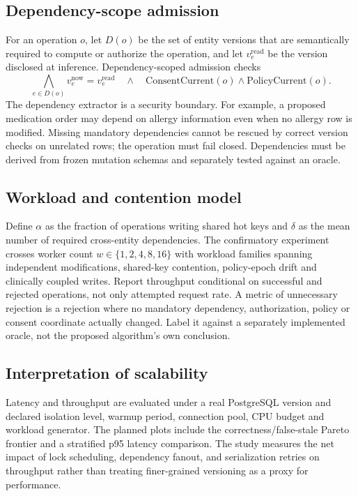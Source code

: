 \documentclass[11pt,a4paper]{article}
\begin{document}
\subsection{Dependency-scope admission}
For an operation $o$, let $D(o)$ be the set of entity versions that are semantically required to compute or authorize the operation, and let $v_e^{\mathrm{read}}$ be the version disclosed at inference. Dependency-scoped admission checks
\begin{equation}
  \bigwedge_{e\in D(o)}v_e^{\mathrm{now}}=v_e^{\mathrm{read}}
  \quad\land\quad\mathrm{ConsentCurrent}(o)\land\mathrm{PolicyCurrent}(o).
\end{equation}
The dependency extractor is a security boundary. For example, a proposed medication order may depend on allergy information even when no allergy row is modified. Missing mandatory dependencies cannot be rescued by correct version checks on unrelated rows; the operation must fail closed. Dependencies must be derived from frozen mutation schemas and separately tested against an oracle.

\subsection{Workload and contention model}
Define $\alpha$ as the fraction of operations writing shared hot keys and $\delta$ as the mean number of required cross-entity dependencies. The confirmatory experiment crosses worker count $w\in\{1,2,4,8,16\}$ with workload families spanning independent modifications, shared-key contention, policy-epoch drift and clinically coupled writes. Report throughput conditional on successful and rejected operations, not only attempted request rate. A metric of unnecessary rejection is a rejection where no mandatory dependency, authorization, policy or consent coordinate actually changed. Label it against a separately implemented oracle, not the proposed algorithm's own conclusion.

\subsection{Interpretation of scalability}
Latency and throughput are evaluated under a real PostgreSQL version and declared isolation level, warmup period, connection pool, CPU budget and workload generator. The planned plots include the correctness/false-stale Pareto frontier and a stratified p95 latency comparison. The study measures the net impact of lock scheduling, dependency fanout, and serialization retries on throughput rather than treating finer-grained versioning as a proxy for performance.
\end{document}
